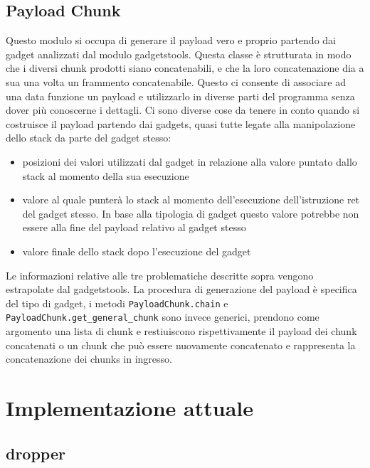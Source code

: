 \subsection{Payload Chunk}

Questo modulo si occupa di generare il payload vero e proprio partendo
dai gadget analizzati dal modulo gadgetstools. Questa classe è
strutturata in modo che i diversi chunk prodotti siano concatenabili,
e che la loro concatenazione dia a sua una volta un frammento
concatenabile. Questo ci consente di associare ad una data funzione un
payload e utilizzarlo in diverse parti del programma senza dover più
conoscerne i dettagli. Ci sono diverse cose da tenere in conto quando
si costruisce il payload partendo dai gadgets, quasi tutte legate alla
manipolazione dello stack da parte del gadget stesso:

\begin{itemize}

  \item posizioni dei valori utilizzati dal gadget in relazione alla
    valore puntato dallo stack al momento della sua esecuzione

  \item valore al quale punterà lo stack al momento dell'esecuzione
    dell'istruzione ret del gadget stesso. In base alla tipologia di
    gadget questo valore potrebbe non essere alla fine del payload
    relativo al gadget stesso
    
  \item valore finale dello stack dopo l'esecuzione del gadget

\end{itemize}

Le informazioni relative alle tre problematiche descritte sopra
vengono estrapolate dal gadgetstools. La procedura di generazione del
payload è specifica del tipo di gadget, i metodi
\lstinline{PayloadChunk.chain} e
\lstinline{PayloadChunk.get_general_chunk} sono invece generici,
prendono come argomento una lista di chunk e restiuiscono
rispettivamente il payload dei chunk concatenati o un chunk che può
essere nuovamente concatenato e rappresenta la concatenazione dei
chunks in ingresso.


\section{Implementazione attuale}

\subsection{dropper}

